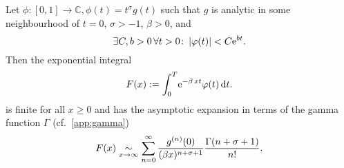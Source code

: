 Let $\phi\colon [0,1] \to \mathbb{C}, \phi(t) = t^\sigma g(t)$ such that $g$ is
analytic in some neighbourhood of $t=0$, $\sigma > -1$, $\beta > 0$, and
\begin{equation*}
  \exists C, b > 0\, \forall t > 0\colon \Abs{\phi(t)} < C \Eto{bt}.
\end{equation*}
Then the exponential integral
\begin{align*}
  F(x) := \Integ[T]{0}{t}{\Eto{-\beta\,xt}\phi(t)}.
\end{align*}
is finite for all $x \geq 0$ and has the asymptotic expansion in terms of the
gamma function $\Gamma$ (cf.\ \cref{app:gamma})
\begin{equation*}
  F(x)\SimAs{x\to\infty}\sum_{n=0}^{\infty}
  \frac{g^{(n)}(0)}{(\beta x)^{n+\sigma+1}} \frac{\Gamma(n+\sigma+1)}{n!}.
\end{equation*}
